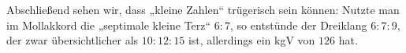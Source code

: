 Abschließend sehen wir, dass „kleine Zahlen“ trügerisch sein können: Nutzte man
im Mollakkord die „septimale kleine Terz“ $6:7$, so entstünde der Dreiklang
$6:7:9$, der zwar übersichtlicher als $10:12:15$ ist, allerdings ein kgV von
$126$ hat.

\enlargethispage{\baselineskip}

